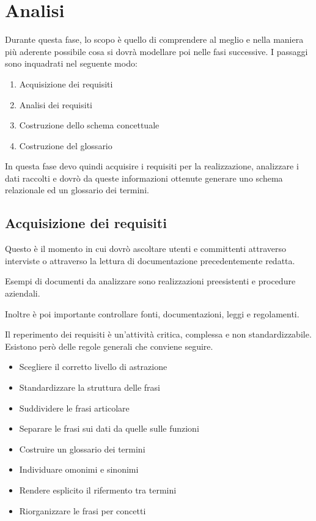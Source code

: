 \section{Analisi}

Durante questa fase, lo scopo è quello di comprendere al meglio e nella maniera più aderente possibile cosa si dovrà modellare poi nelle fasi successive. I passaggi sono inquadrati nel seguente modo:

\begin{enumerate}
    \item Acquisizione dei requisiti
    \item Analisi dei requisiti
    \item Costruzione dello schema concettuale
    \item Costruzione del glossario
\end{enumerate}

In questa fase devo quindi acquisire i requisiti per la realizzazione, analizzare i dati raccolti e dovrò da queste informazioni ottenute generare uno schema relazionale ed un glossario dei termini.

\subsection{Acquisizione dei requisiti}

Questo è il momento in cui dovrò ascoltare utenti e committenti attraverso interviste o attraverso la lettura di documentazione precedentemente redatta.

Esempi di documenti da analizzare sono realizzazioni preesistenti e procedure aziendali.

Inoltre è poi importante controllare fonti, documentazioni, leggi e regolamenti.

Il reperimento dei requisiti è un'attività critica, complessa e non standardizzabile. Esistono però delle regole generali che conviene seguire.

\begin{itemize}
    \item Scegliere il corretto livello di astrazione
    \item Standardizzare la struttura delle frasi
    \item Suddividere le frasi articolare
    \item Separare le frasi sui dati da quelle sulle funzioni
    \item Costruire un glossario dei termini
    \item Individuare omonimi e sinonimi
    \item Rendere esplicito il rifermento tra termini
    \item Riorganizzare le frasi per concetti
\end{itemize}



